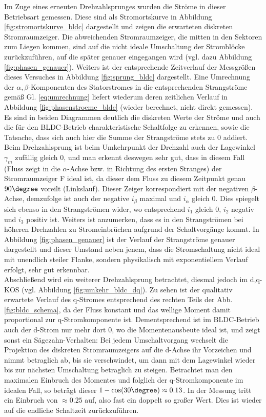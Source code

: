 \noindent Im Zuge eines erneuten Drehzahlsprunges wurden die Ströme in dieser Betriebsart gemessen. Diese sind als Stromortskurve in Abbildung \ref{fig:stromortskurve_bldc} dargestellt und zeigen die erwarteten diskreten Stromraumzeiger. Die abweichenden Stromraumzeiger, die mitten in den Sektoren zum Liegen kommen, sind auf die nicht ideale Umschaltung der Stromblöcke zurückzuführen, auf die später genauer eingegangen wird (vgl. dazu Abbildung \ref{fig:phasen_genauer}).
\noindent Weiters ist der entsprechende Zeitverlauf der Messgrößen dieses Versuches in Abbildung \ref{fig:sprung_bldc} dargestellt. Eine Umrechnung der $\alpha, \beta$-Komponenten des Statorstromes in die entsprechenden Strangströme gemäß Gl. \ref{eq:umrechnung} liefert wiederum deren zeitlichen Verlauf in Abbildung \ref{fig:phasenstroeme_bldc} (wieder berechnet, nicht direkt gemessen). Es sind in beiden Diagrammen deutlich die diskreten Werte der Ströme und auch die für den BLDC-Betrieb charakteristische Schaltfolge zu erkennen, sowie die Tatsache, dass sich auch hier die Summe der Strangströme stets zu 0 addiert. Beim Drehzahlsprung ist beim Umkehrpunkt der Drehzahl auch der Lagewinkel $\gamma_m$ zufällig gleich 0, und man erkennt deswegen sehr gut, dass in diesem Fall (Fluss zeigt in die $\alpha$-Achse bzw. in Richtung des ersten Stranges) der Stromraumzeiger F ideal ist, da dieser dem Fluss zu diesem Zeitpunkt genau $90\degree$ voreilt (Linkslauf). Dieser Zeiger korrespondiert mit der negativen $\beta$-Achse, demzufolge ist auch der negative $i_{\beta}$ maximal und $i_{\alpha}$ gleich 0. Dies spiegelt sich ebenso in den Strangströmen wider, wo entsprechend $i_1$ gleich 0, $i_2$ negativ und $i_3$ positiv ist. Weiters ist anzumerken, dass es in den Strangströmen bei höheren Drehzahlen zu Stromeinbrüchen aufgrund der Schaltvorgänge kommt. In Abbildung \ref{fig:phasen_genauer} ist der Verlauf der Strangströme genauer dargestellt und dieser Umstand neben jenem, dass die Stromschaltung nicht ideal mit unendlich steiler Flanke, sondern physikalisch mit exponentiellem Verlauf erfolgt, sehr gut erkennbar.\\
\noindent Abschließend wird ein weiterer Drehzahlsprung betrachtet, diesmal jedoch im d,q-KOS (vgl. Abbildung \ref{fig:umkehr_bldc_dq}). Zu sehen ist der qualitativ erwartete Verlauf des q-Stromes entsprechend des rechten Teils der Abb. \ref{fig:bldc_schema}, da der Fluss konstant und das wellige Moment damit proportional zur q-Stromkomponente ist. Dementsprechend ist im BLDC-Betrieb auch der d-Strom nur mehr dort 0, wo die Momentenausbeute ideal ist, und zeigt sonst ein Sägezahn-Verhalten: Bei jedem Umschaltvorgang wechselt die Projektion des diskreten Stromraumzeigers auf die d-Achse ihr Vorzeichen und nimmt betraglich ab, bis sie verschwindet, um dann mit dem Lagewinkel wieder bis zur nächsten Umschaltung betraglich zu steigen. Betrachtet man den maximalen Einbruch des Momentes und folglich der q-Stromkomponente im idealen Fall, so beträgt dieser $1-\cos(30\degree) \approx 0.13$. In der Messung tritt ein Einbruch von $\approx 0.25$ auf, also fast ein doppelt so großer Wert. Dies ist wieder auf die endliche Schaltzeit zurückzuführen.







